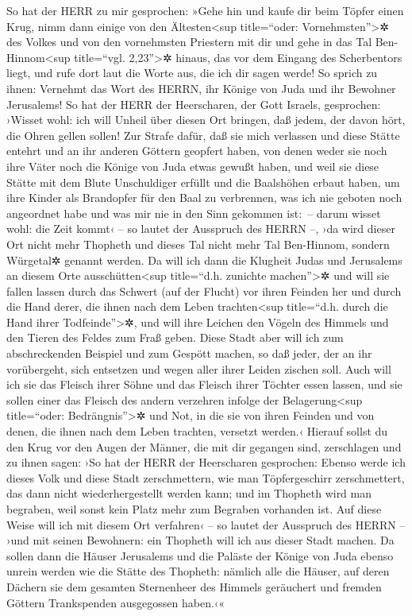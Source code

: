 So hat der HERR zu mir gesprochen: »Gehe hin und kaufe dir
beim Töpfer einen Krug, nimm dann einige von den Ältesten\textless sup
title=``oder: Vornehmsten''\textgreater✲ des Volkes und von den
vornehmsten Priestern mit dir und gehe in das Tal
Ben-Hinnom\textless sup title=``vgl. 2,23''\textgreater✲ hinaus, das vor
dem Eingang des Scherbentors liegt, und rufe dort laut die Worte aus,
die ich dir sagen werde! So sprich zu ihnen: Vernehmt das
Wort des HERRN, ihr Könige von Juda und ihr Bewohner Jerusalems! So hat
der HERR der Heerscharen, der Gott Israels, gesprochen: ›Wisset wohl:
ich will Unheil über diesen Ort bringen, daß jedem, der davon hört, die
Ohren gellen sollen! Zur Strafe dafür, daß sie mich
verlassen und diese Stätte entehrt und an ihr anderen Göttern geopfert
haben, von denen weder sie noch ihre Väter noch die Könige von Juda
etwas gewußt haben, und weil sie diese Stätte mit dem Blute Unschuldiger
erfüllt und die Baalshöhen erbaut haben, um ihre Kinder
als Brandopfer für den Baal zu verbrennen, was ich nie geboten noch
angeordnet habe und was mir nie in den Sinn gekommen ist:~--
darum wisset wohl: die Zeit kommt‹ -- so lautet der
Ausspruch des HERRN --, ›da wird dieser Ort nicht mehr Thopheth und
dieses Tal nicht mehr Tal Ben-Hinnom, sondern Würgetal✲ genannt werden.
Da will ich dann die Klugheit Judas und Jerusalems an
diesem Orte ausschütten\textless sup title=``d.h. zunichte
machen''\textgreater✲ und will sie fallen lassen durch das Schwert (auf
der Flucht) vor ihren Feinden her und durch die Hand derer, die ihnen
nach dem Leben trachten\textless sup title=``d.h. durch die Hand ihrer
Todfeinde''\textgreater✲, und will ihre Leichen den Vögeln des Himmels
und den Tieren des Feldes zum Fraß geben. Diese Stadt aber
will ich zum abschreckenden Beispiel und zum Gespött machen, so daß
jeder, der an ihr vorübergeht, sich entsetzen und wegen aller ihrer
Leiden zischen soll. Auch will ich sie das Fleisch ihrer
Söhne und das Fleisch ihrer Töchter essen lassen, und sie sollen einer
das Fleisch des andern verzehren infolge der Belagerung\textless sup
title=``oder: Bedrängnis''\textgreater✲ und Not, in die sie von ihren
Feinden und von denen, die ihnen nach dem Leben trachten, versetzt
werden.‹ Hierauf sollst du den Krug vor den Augen der
Männer, die mit dir gegangen sind, zerschlagen und zu
ihnen sagen: ›So hat der HERR der Heerscharen gesprochen: Ebenso werde
ich dieses Volk und diese Stadt zerschmettern, wie man Töpfergeschirr
zerschmettert, das dann nicht wiederhergestellt werden kann; und im
Thopheth wird man begraben, weil sonst kein Platz mehr zum Begraben
vorhanden ist. Auf diese Weise will ich mit diesem Ort
verfahren‹ -- so lautet der Ausspruch des HERRN -- ›und mit seinen
Bewohnern: ein Thopheth will ich aus dieser Stadt machen.
Da sollen dann die Häuser Jerusalems und die Paläste der
Könige von Juda ebenso unrein werden wie die Stätte des Thopheth:
nämlich alle die Häuser, auf deren Dächern sie dem gesamten Sternenheer
des Himmels geräuchert und fremden Göttern Trankspenden ausgegossen
haben.‹«

